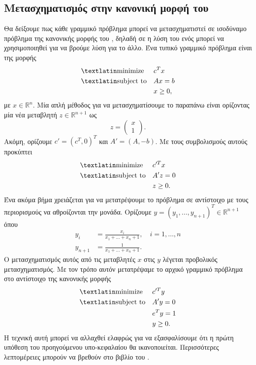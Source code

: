 \subsection{Μετασχηματισμός στην κανονική μορφή του }
Θα δείξουμε πως κάθε γραμμικό πρόβλημα μπορεί να μετασχηματιστεί σε ισοδύναμο
πρόβλημα της κανονικής μορφής του , δηλαδή σε η λύση του
ενός μπορεί να χρησιμοποιηθεί για να βρούμε λύση για το άλλο. Ένα τυπικό
γραμμικό πρόβλημα είναι της μορφής
\begin{equation*}
    \begin{aligned}
        & {\text{\tl{minimize}}}
        & & c^T x \\
        & \text{\tl{subject to}}
        & & Ax = b \\
        &&& x \geq 0,
    \end{aligned}
\end{equation*}
με \( x \in \mathbb{R}^n\). Μία απλή μέθοδος για να μετασχηματίσουμε το παραπάνω
είναι ορίζοντας μία νέα μεταβλητή \( z \in \mathbb{R}^{n+1} \) ως
\begin{equation*}
    z = \begin{pmatrix}x \\ 1 \end{pmatrix}.
\end{equation*}
Ακόμη, ορίζουμε \( c' = (c^T, 0)^T \) και \( A' = (A, -b) \). Με τους
συμβολισμούς αυτούς προκύπτει
\begin{equation*}
    \begin{aligned}
        & {\text{\tl{minimize}}}
        & & c'^T x \\
        & \text{\tl{subject to}}
        & & A'z = 0 \\
        &&& z \geq 0.
    \end{aligned}
\end{equation*}
Ένα ακόμα βήμα χρειάζεται για να μετατρέψουμε το πρόβλημα σε αντίστοιχο με τους
περιορισμούς να αθροίζονται την μονάδα. Ορίζουμε \( y = (y_1, \dots, y_{n+1})^T
\in \mathbb{R}^{n+1} \) όπου
\begin{align*}
    y_i &= \frac{x_i}{x_1 + \dots + x_n + 1}, \quad i = 1, \dots, n \\
    y_{n+1} &= \frac{1}{x_1 + \dots + x_n + 1}.
\end{align*}
Ο μετασχηματισμός αυτός από τις μεταβλητές \(x\) στις \(y\) λέγεται προβολικός
μετασχηματισμός. Με τον τρόπο αυτόν μετατρέψαμε το αρχικό γραμμικό πρόβλημα στο
αντίστοιχο της κανονικής μορφής 
\begin{equation*}
    \begin{aligned}
        & {\text{\tl{minimize}}}
        & & c'^T y \\
        & \text{\tl{subject to}}
        & & A'y = 0 \\
        &&& e^Ty = 1 \\
        &&& y \geq 0.
    \end{aligned}
\end{equation*}
Η τεχνική αυτή μπορεί να αλλαχθεί ελαφρώς για να εξασφαλίσουμε ότι η πρώτη
υπόθεση του προηγούμενου υπο-κεφαλαίου θα ικανοποιείται. Περισσότερες
λεπτομέρειες μπορούν να βρεθούν στο βιβλίο του \cite{chong2010}.

